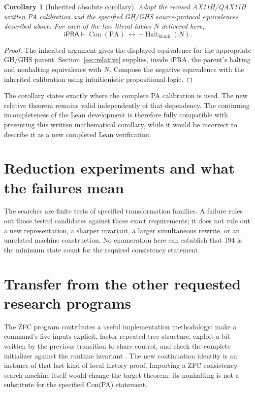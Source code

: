 \documentclass[11pt,letterpaper]{article}
\newtheorem{corollary}[theorem]{Corollary}
\newcommand{\PA}{\mathrm{PA}}
\newcommand{\Con}{\operatorname{Con}}
\newcommand{\ipra}{\mathsf{iPRA}}
\begin{document}
\begin{corollary}[Inherited absolute corollary]
Adopt the revised AX11H/QAX11H written PA calibration and the specified
GH/GHS source-protocol equivalences described above. For each of the two
literal tables $N$ delivered here,
\[
\ipra\vdash\Con(\PA)\ \longleftrightarrow\
              \neg\operatorname{Halt}_{\mathrm{blank}}(N).
\]
\end{corollary}
\begin{proof}
The inherited argument gives the displayed equivalence for the appropriate
GH/GHS parent. Section~\ref{sec:relative} supplies, inside iPRA, the parent's
halting and nonhalting equivalence with $N$. Compose the negative equivalence
with the inherited calibration using intuitionistic propositional logic.
\end{proof}

The corollary states exactly where the complete PA calibration is used.
The new relative theorem remains valid independently of that dependency.
The continuing incompleteness of the Lean development is therefore fully
compatible with presenting this written mathematical corollary, while it
would be incorrect to describe it as a new completed Lean verification.

\section{Reduction experiments and what the failures mean}
\label{sec:search}


The searches are finite tests of specified transformation families. A
failure rules out those tested candidates against those exact requirements;
it does not rule out a new representation, a sharper invariant, a larger
simultaneous rewrite, or an unrelated machine construction. No enumeration
here can establish that 194 is the minimum state count for the required
consistency statement.

\section{Transfer from the other requested research programs}
The ZFC program contributes a useful implementation methodology: make a
command's live inputs explicit, factor repeated tree structure, exploit a
bit written by the previous transition to share control, and check the
complete initializer against the runtime invariant \cite{zfc}. The new continuation
identity is an instance of that last kind of local history proof. Importing
a ZFC consistency-search machine itself would change the target theorem;
its nonhalting is not a substitute for the specified Con(PA) statement.
\end{document}
